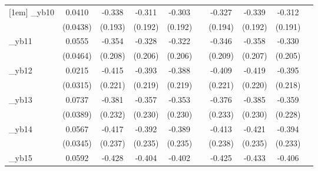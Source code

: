 \begin{table}[htbp]
\begin{tabular}{l*{9}{c}}
[1em]
\_yb10       &      0.0410         &      -0.338\sym{*}  &      -0.311         &      -0.303         &                     &      -0.327\sym{*}  &      -0.339\sym{*}  &      -0.312         &                     \\
            &    (0.0438)         &     (0.193)         &     (0.192)         &     (0.192)         &                     &     (0.194)         &     (0.192)         &     (0.191)         &                     \\
[1em]
\_yb11       &      0.0555         &      -0.354\sym{*}  &      -0.328         &      -0.322         &                     &      -0.346\sym{*}  &      -0.358\sym{*}  &      -0.330         &                     \\
            &    (0.0464)         &     (0.208)         &     (0.206)         &     (0.206)         &                     &     (0.209)         &     (0.207)         &     (0.205)         &                     \\
[1em]
\_yb12       &      0.0215         &      -0.415\sym{*}  &      -0.393\sym{*}  &      -0.388\sym{*}  &                     &      -0.409\sym{*}  &      -0.419\sym{*}  &      -0.395\sym{*}  &                     \\
            &    (0.0315)         &     (0.221)         &     (0.219)         &     (0.219)         &                     &     (0.221)         &     (0.220)         &     (0.218)         &                     \\
[1em]
\_yb13       &      0.0737\sym{*}  &      -0.381\sym{*}  &      -0.357         &      -0.353         &                     &      -0.376         &      -0.385\sym{*}  &      -0.359         &                     \\
            &    (0.0389)         &     (0.232)         &     (0.230)         &     (0.230)         &                     &     (0.233)         &     (0.230)         &     (0.228)         &                     \\
[1em]
\_yb14       &      0.0567         &      -0.417\sym{*}  &      -0.392\sym{*}  &      -0.389\sym{*}  &                     &      -0.413\sym{*}  &      -0.421\sym{*}  &      -0.394\sym{*}  &                     \\
            &    (0.0345)         &     (0.237)         &     (0.235)         &     (0.235)         &                     &     (0.238)         &     (0.235)         &     (0.233)         &                     \\
[1em]
\_yb15       &      0.0592\sym{*}  &      -0.428\sym{*}  &      -0.404\sym{*}  &      -0.402\sym{*}  &                     &      -0.425\sym{*}  &      -0.433\sym{*}  &      -0.406\sym{*}  &                     \\

\end{tabular}
\end{table}
